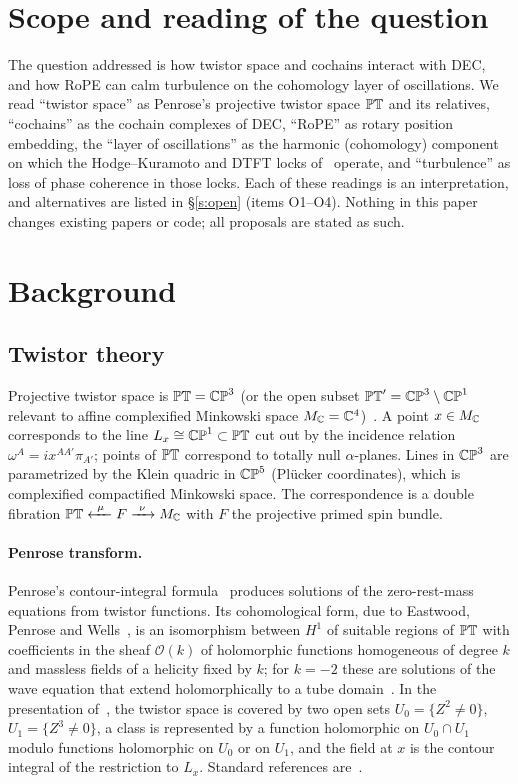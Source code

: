 \documentclass[10pt]{article}
\theoremstyle{definition}
\newcommand{\cO}{\mathcal O}\newcommand{\cH}{\mathcal H}
\begin{document}
\tableofcontents

\section{Scope and reading of the question}\label{s:scope}
The question addressed is how twistor space and cochains interact with DEC, and how RoPE can calm turbulence on the cohomology layer of oscillations. We read ``twistor space'' as Penrose's projective twistor space $\mathbb{PT}$ and its relatives, ``cochains'' as the cochain complexes of DEC, ``RoPE'' as rotary position embedding, the ``layer of oscillations'' as the harmonic (cohomology) component on which the Hodge--Kuramoto and DTFT locks of~\cite{pv2,dtft} operate, and ``turbulence'' as loss of phase coherence in those locks. Each of these readings is an interpretation, and alternatives are listed in \S\ref{s:open} (items O1--O4). Nothing in this paper changes existing papers or code; all proposals are stated as such.

\section{Background}\label{s:bg}
\subsection{Twistor theory}
Projective twistor space is $\mathbb{PT}=\mathbb{CP}^3$ (or the open subset $\mathbb{PT}'=\mathbb{CP}^3\setminus\mathbb{CP}^1$ relevant to affine complexified Minkowski space $M_\mathbb C=\mathbb C^4$)~\cite{penrose67,adm17}. A point $x\in M_\mathbb C$ corresponds to the line $L_x\cong\mathbb{CP}^1\subset\mathbb{PT}$ cut out by the incidence relation $\omega^A=ix^{AA'}\pi_{A'}$; points of $\mathbb{PT}$ correspond to totally null $\alpha$-planes. Lines in $\mathbb{CP}^3$ are parametrized by the Klein quadric in $\mathbb{CP}^5$ (Pl\"ucker coordinates), which is complexified compactified Minkowski space. The correspondence is a double fibration $\PT\xleftarrow{\ \mu\ }F\xrightarrow{\ \nu\ }M_\C$ with $F$ the projective primed spin bundle.

\paragraph{Penrose transform.} Penrose's contour-integral formula~\cite{penrose69} produces solutions of the zero-rest-mass equations from twistor functions. Its cohomological form, due to Eastwood, Penrose and Wells~\cite{epw}, is an isomorphism between $H^1$ of suitable regions of $\mathbb{PT}$ with coefficients in the sheaf $\cO(k)$ of holomorphic functions homogeneous of degree $k$ and massless fields of a helicity fixed by $k$; for $k=-2$ these are solutions of the wave equation that extend holomorphically to a tube domain~\cite{epw,adm17}. In the presentation of~\cite{adm17}, the twistor space is covered by two open sets $U_0=\{Z^2\neq0\}$, $U_1=\{Z^3\neq0\}$, a class is represented by a function holomorphic on $U_0\cap U_1$ modulo functions holomorphic on $U_0$ or on $U_1$, and the field at $x$ is the contour integral of the restriction to $L_x$. Standard references are~\cite{huggetttod,wardwells,bastoneastwood}.
\end{document}
